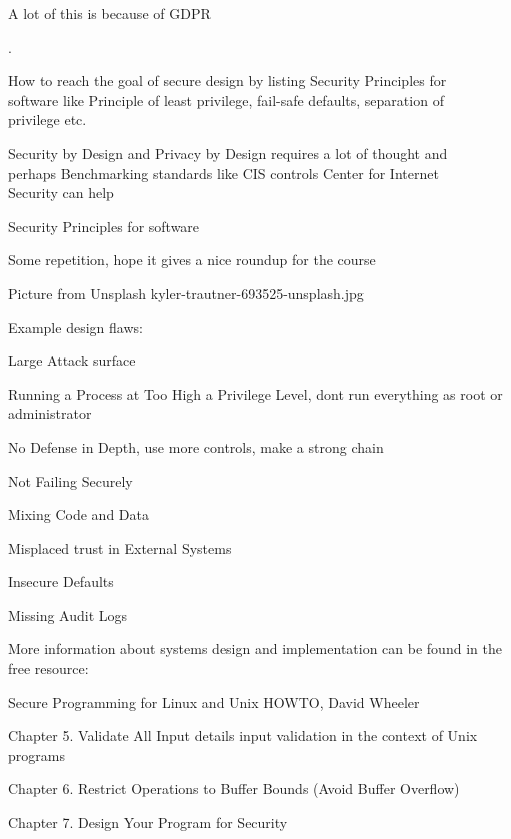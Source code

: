 \documentclass[Screen16to9,17pt]{foils}
\begin{document}
\vskip 2cm
\centerline{A lot of this is because of GDPR}


.

\begin{list2}
\item How to reach the goal of secure design
by listing Security Principles for \\
software like Principle of least privilege, fail-safe defaults, separation of\\
privilege etc.
\item Security by Design and Privacy by Design requires a lot of thought and\\ perhaps Benchmarking standards
like CIS controls Center for Internet\\
 Security can help
\item Security Principles for software
\item Some repetition, hope it gives a nice roundup for the course
\end{list2}

Picture from Unsplash kyler-trautner-693525-unsplash.jpg


Example design flaws:
\begin{list2}
\item Large Attack surface
\item Running a Process at Too High a Privilege Level, dont run everything as root or administrator
\item No Defense in Depth, use more controls, make a strong chain
\item Not Failing Securely
\item Mixing Code and Data
\item Misplaced trust in External Systems
\item Insecure Defaults
\item Missing Audit Logs
\end{list2}


\begin{list1}
\item More information about systems design and implementation can be found in the free resource:
\item Secure Programming for Linux and Unix HOWTO, David Wheeler
\item {}
\item Chapter 5. Validate All Input details input validation in the context of Unix programs
\item Chapter 6. Restrict Operations to Buffer Bounds (Avoid Buffer Overflow)
\item Chapter 7. Design Your Program for Security
\end{list1}
\end{document}
